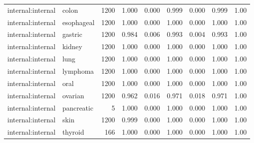 \begin{tabular}{@{}llrcccccc@{}}
internal:internal & colon & 1200 & 1.000 & 0.000 & 0.999 & 0.000 & 0.999 & 1.00 \\
internal:internal & esophageal & 1200 & 1.000 & 0.000 & 1.000 & 0.000 & 1.000 & 1.00 \\
internal:internal & gastric & 1200 & 0.984 & 0.006 & 0.993 & 0.004 & 0.993 & 1.00 \\
internal:internal & kidney & 1200 & 1.000 & 0.000 & 1.000 & 0.000 & 1.000 & 1.00 \\
internal:internal & lung & 1200 & 1.000 & 0.000 & 1.000 & 0.000 & 1.000 & 1.00 \\
internal:internal & lymphoma & 1200 & 1.000 & 0.000 & 1.000 & 0.000 & 1.000 & 1.00 \\
internal:internal & oral & 1200 & 1.000 & 0.000 & 1.000 & 0.000 & 1.000 & 1.00 \\
internal:internal & ovarian & 1200 & 0.962 & 0.016 & 0.971 & 0.018 & 0.971 & 1.00 \\
internal:internal & pancreatic & 5 & 1.000 & 0.000 & 1.000 & 0.000 & 1.000 & 1.00 \\
internal:internal & skin & 1200 & 0.999 & 0.000 & 1.000 & 0.000 & 1.000 & 1.00 \\
internal:internal & thyroid & 166 & 1.000 & 0.000 & 1.000 & 0.000 & 1.000 & 1.00 \\
\bottomrule
\end{tabular}